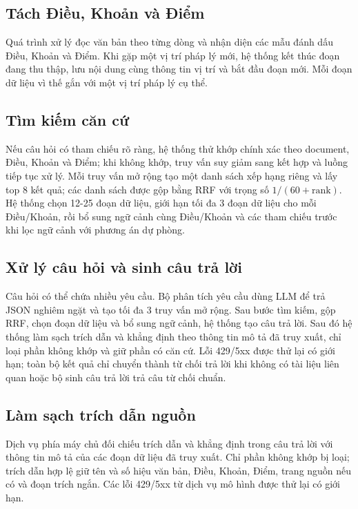 \documentclass[12pt,a4paper,oneside]{report}
\begin{document}
\subsection{Tách Điều, Khoản và Điểm}
Quá trình xử lý đọc văn bản theo từng dòng và nhận diện các mẫu đánh dấu Điều, Khoản và Điểm. Khi gặp một vị trí pháp lý mới, hệ thống kết thúc đoạn đang thu thập, lưu nội dung cùng thông tin vị trí và bắt đầu đoạn mới. Mỗi đoạn dữ liệu vì thế gắn với một vị trí pháp lý cụ thể.

\subsection{Tìm kiếm căn cứ}
Nếu câu hỏi có tham chiếu rõ ràng, hệ thống thử khớp chính xác theo document, Điều, Khoản và Điểm; khi không khớp, truy vấn suy giảm sang kết hợp và luồng tiếp tục xử lý. Mỗi truy vấn mở rộng tạo một danh sách xếp hạng riêng và lấy top 8 kết quả; các danh sách được gộp bằng RRF với trọng số $1/(60+\mathrm{rank})$. Hệ thống chọn 12-25 đoạn dữ liệu, giới hạn tối đa 3 đoạn dữ liệu cho mỗi Điều/Khoản, rồi bổ sung ngữ cảnh cùng Điều/Khoản và các tham chiếu trước khi lọc ngữ cảnh với phương án dự phòng.

\subsection{Xử lý câu hỏi và sinh câu trả lời}
Câu hỏi có thể chứa nhiều yêu cầu. Bộ phân tích yêu cầu dùng LLM để trả JSON nghiêm ngặt và tạo tối đa 3 truy vấn mở rộng. Sau bước tìm kiếm, gộp RRF, chọn đoạn dữ liệu và bổ sung ngữ cảnh, hệ thống tạo câu trả lời. Sau đó hệ thống làm sạch trích dẫn và khẳng định theo thông tin mô tả đã truy xuất, chỉ loại phần không khớp và giữ phần có căn cứ. Lỗi 429/5xx được thử lại có giới hạn; toàn bộ kết quả chỉ chuyển thành từ chối trả lời khi không có tài liệu liên quan hoặc bộ sinh câu trả lời trả câu từ chối chuẩn.

\subsection{Làm sạch trích dẫn nguồn}
Dịch vụ phía máy chủ đối chiếu trích dẫn và khẳng định trong câu trả lời với thông tin mô tả của các đoạn dữ liệu đã truy xuất. Chỉ phần không khớp bị loại; trích dẫn hợp lệ giữ tên và số hiệu văn bản, Điều, Khoản, Điểm, trang nguồn nếu có và đoạn trích ngắn. Các lỗi 429/5xx từ dịch vụ mô hình được thử lại có giới hạn.
\end{document}
